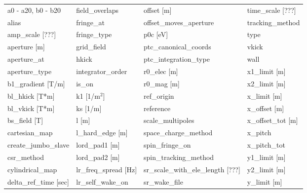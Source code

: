  \begin{tabular}{llll} \toprule
a0 - a20, b0 - b20             & field_overlaps                 & offset [m]                     & time_scale [???]               \\
alias                          & fringe_at                      & offset_moves_aperture          & tracking_method                \\
amp_scale [???]                & fringe_type                    & p0c [eV]                       & type                           \\
aperture [m]                   & grid_field                     & ptc_canonical_coords           & vkick                          \\
aperture_at                    & hkick                          & ptc_integration_type           & wall                           \\
aperture_type                  & integrator_order               & r0_elec [m]                    & x1_limit [m]                   \\
b1_gradient [T/m]              & is_on                          & r0_mag [m]                     & x2_limit [m]                   \\
bl_hkick [T*m]                 & k1 [1/m$^2$]                   & ref_origin                     & x_limit [m]                    \\
bl_vkick [T*m]                 & ks [1/m]                       & reference                      & x_offset [m]                   \\
bs_field [T]                   & l [m]                          & scale_multipoles               & x_offset_tot [m]               \\
cartesian_map                  & l_hard_edge [m]                & space_charge_method            & x_pitch                        \\
create_jumbo_slave             & lord_pad1 [m]                  & spin_fringe_on                 & x_pitch_tot                    \\
csr_method                     & lord_pad2 [m]                  & spin_tracking_method           & y1_limit [m]                   \\
cylindrical_map                & lr_freq_spread [Hz]            & sr_scale_with_ele_length [???] & y2_limit [m]                   \\
delta_ref_time [sec]           & lr_self_wake_on                & sr_wake_file                   & y_limit [m]                    \\

\end{tabular}

